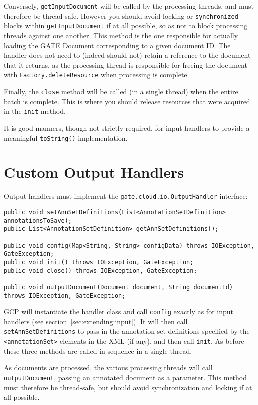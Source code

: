 Conversely, \verb!getInputDocument! will be called by the processing threads,
and must therefore be thread-safe.  However you should avoid locking or
\verb!synchronized! blocks within \verb!getInputDocument! if at all possible,
so as not to block processing threads against one another.  This method is the
one responsible for actually loading the GATE Document corresponding to a given
document ID.  The handler does not need to (indeed should not) retain a
reference to the document that it returns, as the processing thread is
responsible for freeing the document with \verb!Factory.deleteResource! when
processing is complete.

Finally, the \verb!close! method will be called (in a single thread) when the
entire batch is complete.  This is where you should release resources that were
acquired in the \verb!init! method.

It is good manners, though not strictly required, for input handlers to provide
a meaningful \verb!toString()! implementation.

\section{Custom Output Handlers}

Output handlers must implement the \verb!gate.cloud.io.OutputHandler!
interface:

\begin{lstlisting}[breaklines]
public void setAnnSetDefinitions(List<AnnotationSetDefinition> annotationsToSave);
public List<AnnotationSetDefinition> getAnnSetDefinitions();

public void config(Map<String, String> configData) throws IOException, GateException;
public void init() throws IOException, GateException;
public void close() throws IOException, GateException;

public void outputDocument(Document document, String documentId) throws IOException, GateException;
\end{lstlisting}

GCP will instantiate the handler class and call \verb!config! exactly as for
input handlers (see section~\ref{sec:extending:input}).  It will then call
\verb!setAnnSetDefinitions! to pass in the annotation set definitions specified
by the \verb!<annotationSet>! elements in the XML (if any), and then call
\verb!init!.  As before these three methods are called in sequence in a single
thread.

As documents are processed, the various processing threads will call
\verb!outputDocument!, passing an annotated document as a parameter.  This
method must therefore be thread-safe, but should avoid synchronization and
locking if at all possible.

